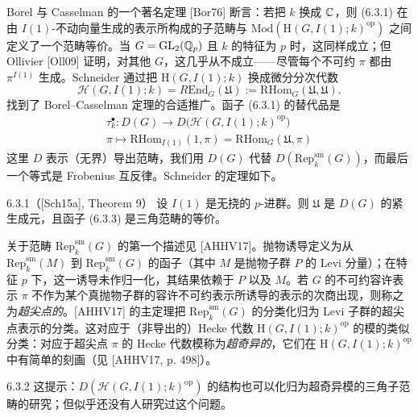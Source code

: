 Borel 与 Casselman 的一个著名定理 [Bor76] 断言：若把 $k$ 换成 $\mathbb{C}$，则 (6.3.1) 在由 $I(1)$-不动向量生成的表示所构成的子范畴与 $\mathrm{Mod}(\mathrm H(G,I(1);k)^{\mathrm{op}})$ 之间定义了一个范畴等价。当 $G=\mathrm{GL}_2(\mathbb{Q}_p)$ 且 $k$ 的特征为 $p$ 时，这同样成立；但 Ollivier [Oll09] 证明，对其他 $G$，这几乎从不成立——尽管每个不可约 $\pi$ 都由 $\pi^{I(1)}$ 生成。Schneider 通过把 $\mathrm H(G,I(1);k)$ 换成微分分次代数
\begin{equation}\tag{6.3.2}\label{eq:a6-04-9}
\mathscr H(G,I(1);k)=R\mathrm{End}_G(\mathfrak U):=\mathrm{RHom}_G(\mathfrak U,\mathfrak U).
\end{equation}
找到了 Borel–Casselman 定理的合适推广。函子 (6.3.1) 的替代品是
\begin{equation}\tag{6.3.3}\label{eq:a6-04-10}
\begin{gathered}
\tau^\bullet_k\colon D(G)\to D\bigl(\mathscr H(G,I(1);k)^{\mathrm{op}}\bigr)\\
\pi\mapsto\mathrm{RHom}_{I(1)}(1,\pi)=\mathrm{RHom}_G(\mathfrak U,\pi)
\end{gathered}
\end{equation}
这里 $D$ 表示（无界）导出范畴，我们用 $D(G)$ 代替 $D(\mathrm{Rep}^{\mathrm{sm}}_k(G))$，而最后一个等式是 Frobenius 互反律。Schneider 的定理如下。


\begin{thm}{6.3.1}（[Sch15a], Theorem 9）\label{thm:a6-04-11}
设 $I(1)$ 是无挠的 $p$-进群。则 $\mathfrak U$ 是 $D(G)$ 的紧生成元，且函子 (6.3.3) 是三角范畴的等价。
\end{thm}

关于范畴 $\mathrm{Rep}^{\mathrm{sm}}_k(G)$ 的第一个描述见 [AHHV17]。抛物诱导定义为从 $\mathrm{Rep}^{\mathrm{sm}}_k(M)$ 到 $\mathrm{Rep}^{\mathrm{sm}}_k(G)$ 的函子（其中 $M$ 是抛物子群 $P$ 的 Levi 分量）；在特征 $p$ 下，这一诱导未作归一化，其结果依赖于 $P$ 以及 $M$。若 $G$ 的不可约容许表示 $\pi$ 不作为某个真抛物子群的容许不可约表示所诱导的表示的次商出现，则称之为\emph{超尖点的}。[AHHV17] 的主定理把 $\mathrm{Rep}^{\mathrm{sm}}_k(G)$ 的分类化归为 Levi 子群的超尖点表示的分类。这对应于（非导出的）Hecke 代数 $\mathrm H(G,I(1);k)^{\mathrm{op}}$ 的模的类似分类：对应于超尖点 $\pi$ 的 Hecke 代数模称为\emph{超奇异的}，它们在 $\mathrm H(G,I(1);k)^{\mathrm{op}}$ 中有简单的刻画（见 [AHHV17, p. 498]）。

\begin{rem}{6.3.2}\label{thm:a6-04-12}
这提示：$D(\mathscr H(G,I(1);k)^{\mathrm{op}})$ 的结构也可以化归为超奇异模的三角子范畴的研究；但似乎还没有人研究过这个问题。
\end{rem}

